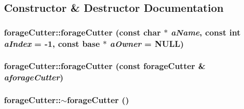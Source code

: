 \subsection{Constructor \& Destructor Documentation}
\hypertarget{classforage_cutter_a3ff5641ceb26a09f971374a5ff796c9f}{
\subsubsection[{forageCutter}]{\setlength{\rightskip}{0pt plus 5cm}forageCutter::forageCutter (const char $\ast$ {\em aName}, \/  const int {\em aIndex} = {\ttfamily -\/1}, \/  const {\bf base} $\ast$ {\em aOwner} = {\ttfamily NULL})}}
\label{classforage_cutter_a3ff5641ceb26a09f971374a5ff796c9f}
\hypertarget{classforage_cutter_a94984cb2375bcad4ff28b311233ef803}{
\subsubsection[{forageCutter}]{\setlength{\rightskip}{0pt plus 5cm}forageCutter::forageCutter (const {\bf forageCutter} \& {\em aforageCutter})}}
\label{classforage_cutter_a94984cb2375bcad4ff28b311233ef803}
\hypertarget{classforage_cutter_a8c5e3bc21fd8db95c681c8f9e81cb25b}{
\subsubsection[{$\sim$forageCutter}]{\setlength{\rightskip}{0pt plus 5cm}forageCutter::$\sim$forageCutter ()}}
\label{classforage_cutter_a8c5e3bc21fd8db95c681c8f9e81cb25b}


